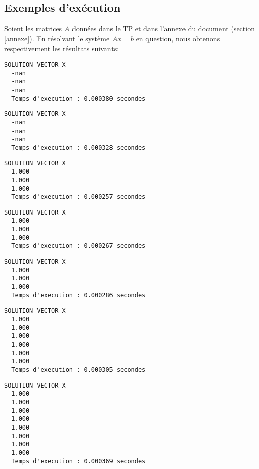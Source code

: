\subsection{Exemples d'exécution}
Soient les matrices $A$ données dans le TP et dans l'annexe du document (section \ref{annexe}).
En résolvant le système $Ax=b$ en question, nous obtenons respectivement les résultats suivants:
\\

\begin{lstlisting}[caption={$A_1X=B$} results, basicstyle=\fontsize{8}{10}\selectfont]
                  SOLUTION VECTOR X 
  -nan   
  -nan   
  -nan   
  Temps d'execution : 0.000380 secondes
\end{lstlisting}

\begin{lstlisting}[caption={$A_2X=B$} results, basicstyle=\fontsize{8}{10}\selectfont]
                  SOLUTION VECTOR X 
  -nan   
  -nan   
  -nan   
  Temps d'execution : 0.000328 secondes
\end{lstlisting}

\begin{lstlisting}[caption={$A_3X=B$} results, basicstyle=\fontsize{8}{10}\selectfont]
                  SOLUTION VECTOR X 
  1.000   
  1.000   
  1.000   
  Temps d'execution : 0.000257 secondes
\end{lstlisting}

\begin{lstlisting}[caption={$A_4X=B$} results, basicstyle=\fontsize{8}{10}\selectfont]
                  SOLUTION VECTOR X 
  1.000   
  1.000   
  1.000   
  Temps d'execution : 0.000267 secondes
\end{lstlisting}

\begin{lstlisting}[caption={$A_5X=B$} results, basicstyle=\fontsize{8}{10}\selectfont]
                  SOLUTION VECTOR X 
  1.000   
  1.000   
  1.000   
  Temps d'execution : 0.000286 secondes
\end{lstlisting}

\begin{lstlisting}[caption={$A_6X=B$} results, basicstyle=\fontsize{8}{10}\selectfont]
                  SOLUTION VECTOR X 
  1.000   
  1.000   
  1.000   
  1.000   
  1.000   
  1.000   
  Temps d'execution : 0.000305 secondes
\end{lstlisting}

\begin{lstlisting}[caption={$A_7X=B$} results, basicstyle=\fontsize{5}{8}\selectfont]
                  SOLUTION VECTOR X 
  1.000   
  1.000   
  1.000   
  1.000   
  1.000   
  1.000   
  1.000   
  1.000   
  Temps d'execution : 0.000369 secondes
\end{lstlisting}

